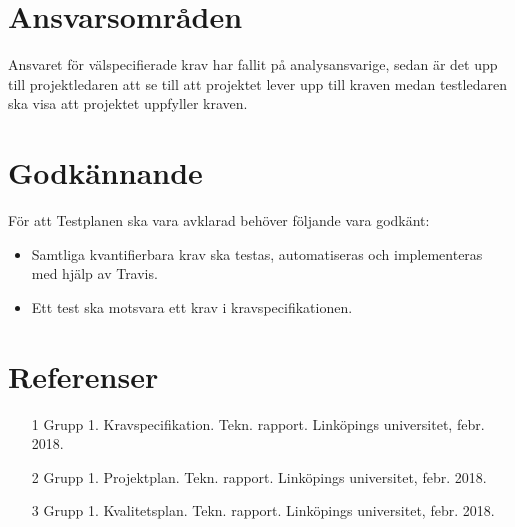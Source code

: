 \section{Ansvarsområden}
	Ansvaret för välspecifierade krav har fallit på analysansvarige, sedan är det upp till projektledaren att se till att projektet lever upp till kraven medan testledaren ska visa att projektet uppfyller kraven.

  

	
	
\section{Godkännande}
	För att Testplanen ska vara avklarad behöver följande vara godkänt:
	\begin{itemize}
	 \item Samtliga kvantifierbara krav ska testas, automatiseras och implementeras med hjälp av Travis.
	 \item Ett test ska motsvara ett krav i kravspecifikationen.
	\end{itemize}
	


\section{Referenser}
	\begin{itemize}
	\item [1] Grupp 1. Kravspecifikation. Tekn. rapport. Linköpings universitet, febr. 2018.
	\item [2] Grupp 1. Projektplan. Tekn. rapport. Linköpings universitet, febr. 2018.
	\item [3] Grupp 1. Kvalitetsplan. Tekn. rapport. Linköpings universitet, febr. 2018.
	\end{itemize}



